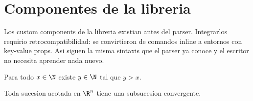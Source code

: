 \section{ Componentes de la libreria }

  Los custom components de la libreria existian antes del parser. Integrarlos
  requirio retrocompatibilidad: se convirtieron de comandos inline a entornos
  con key-value props. Asi siguen la misma sintaxis que el parser ya conoce y
  el escritor no necesita aprender nada nuevo.


  \begin{axiom}[title=Arquimedes, label=ax-arq]
    Para todo $x \in \N$ existe $y \in \N$ tal que $y > x$.
  \end{axiom}

  \begin{theorem}[title=Bolzano-Weierstrass, label=th-bw]
    Toda sucesion acotada en $\R^n$ tiene una subsucesion convergente.
  \end{theorem}




